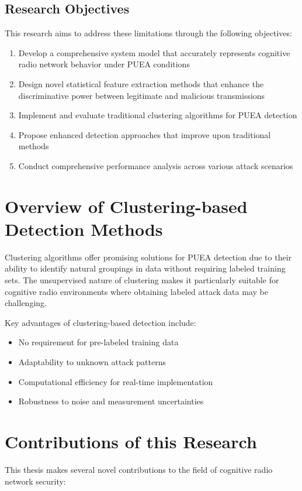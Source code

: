 \subsection{Research Objectives}
This research aims to address these limitations through the following objectives:
\begin{enumerate}
\item Develop a comprehensive system model that accurately represents cognitive radio network behavior under PUEA conditions
\item Design novel statistical feature extraction methods that enhance the discriminative power between legitimate and malicious transmissions
\item Implement and evaluate traditional clustering algorithms for PUEA detection
\item Propose enhanced detection approaches that improve upon traditional methods
\item Conduct comprehensive performance analysis across various attack scenarios
\end{enumerate}

\section{Overview of Clustering-based Detection Methods}
Clustering algorithms offer promising solutions for PUEA detection due to their ability to identify natural groupings in data without requiring labeled training sets. The unsupervised nature of clustering makes it particularly suitable for cognitive radio environments where obtaining labeled attack data may be challenging.

Key advantages of clustering-based detection include:
\begin{itemize}
\item No requirement for pre-labeled training data
\item Adaptability to unknown attack patterns
\item Computational efficiency for real-time implementation
\item Robustness to noise and measurement uncertainties
\end{itemize}

\section{Contributions of this Research}
This thesis makes several novel contributions to the field of cognitive radio network security:

